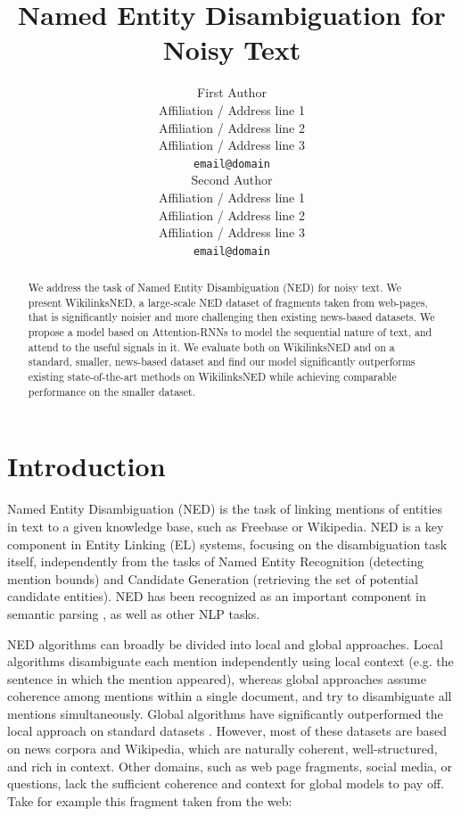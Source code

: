 \documentclass[11pt]{article}
\title{Named Entity Disambiguation for Noisy Text}
\author{First Author \\
	Affiliation / Address line 1 \\
	Affiliation / Address line 2 \\
	Affiliation / Address line 3 \\
	{\tt email@domain} \\\And
	Second Author \\
	Affiliation / Address line 1 \\
	Affiliation / Address line 2 \\
	Affiliation / Address line 3 \\
	{\tt email@domain} \\}
\date{}
\begin{document}
	\maketitle
	\begin{abstract}
		We address the task of Named Entity Disambiguation (NED) for noisy text. 
		We present WikilinksNED, a large-scale NED dataset of fragments taken from web-pages, that is significantly noisier and more challenging then existing news-based datasets.
		We propose a model based on Attention-RNNs to model the sequential nature of text, and attend to the useful signals in it.
		We evaluate both on WikilinksNED and on a standard, smaller, news-based dataset and find our model significantly outperforms existing state-of-the-art methods on WikilinksNED while achieving comparable performance on the smaller dataset. 
	\end{abstract}
	
	
	
	\section{Introduction}
		
	Named Entity Disambiguation (NED) is the task of linking mentions of entities in text to a given knowledge base, such as Freebase or Wikipedia. NED is a key component in Entity Linking (EL) systems, focusing on the disambiguation task itself, independently from the tasks of Named Entity Recognition (detecting mention bounds) and Candidate Generation (retrieving the set of potential candidate entities). NED has been recognized as an important component in semantic parsing \cite{berant2013semantic}, as well as other NLP tasks.
	
	NED algorithms can broadly be divided into local and global approaches. Local algorithms disambiguate each mention independently using local context (e.g. the sentence in which the mention appeared), whereas global approaches assume coherence among mentions within a single document, and try to disambiguate all mentions simultaneously. Global algorithms have significantly outperformed the local approach on standard datasets \cite{guo2014entity,pershina2015personalized,Globerson2016}. However, most of these datasets are based on news corpora and Wikipedia, which are naturally coherent, well-structured, and rich in context. Other domains, such as web page fragments, social media, or questions, lack the sufficient coherence and context for global models to pay off. Take for example this fragment taken from the web:
	
\end{document}

